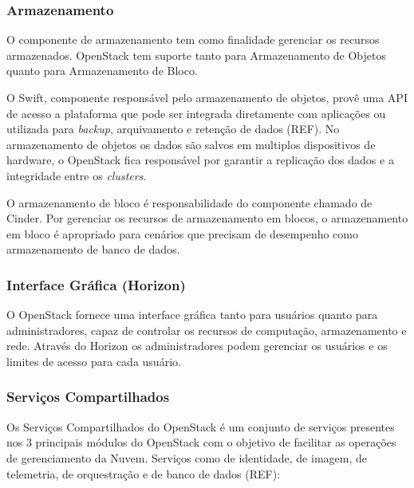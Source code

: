 \subsubsection{Armazenamento}

O componente de armazenamento tem como finalidade gerenciar os recursos armazenados. OpenStack tem suporte tanto para Armazenamento de Objetos quanto para Armazenamento de Bloco.

O Swift, componente responsável pelo armazenamento de objetos, provê uma API de acesso a plataforma que pode ser integrada diretamente com aplicações ou utilizada para \textit{backup}, arquivamento e retenção de dados (REF). No armazenamento de objetos os dados são salvos em multiplos dispositivos de hardware, o OpenStack fica responsável por garantir a replicação dos dados e a integridade entre os \textit{clusters}. 

O armazenamento de bloco é responsabilidade do componente chamado de Cinder. Por gerenciar os recursos de armazenamento em blocos, o armazenamento em bloco é apropriado para cenários que precisam de desempenho como armazenamento de banco de dados.

\subsubsection{Interface Gráfica (Horizon)}

O OpenStack fornece uma interface gráfica tanto para usuários quanto para administradores, capaz de controlar os recursos de computação, armazenamento e rede. Através do Horizon os administradores podem gerenciar os usuários e os limites de acesso para cada usuário.

\subsubsection{Serviços Compartilhados}

Os Serviços Compartilhados do OpenStack é um conjunto de serviços presentes nos 3 principais módulos do OpenStack com o objetivo de facilitar as operações de gerenciamento da Nuvem. Serviços como de identidade, de imagem, de telemetria, de orquestração e de banco de dados (REF):

